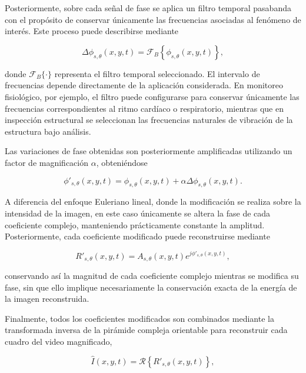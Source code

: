 Posteriormente, sobre cada señal de fase se aplica un filtro temporal pasabanda con el propósito de conservar únicamente las frecuencias asociadas al fenómeno de interés. Este proceso puede describirse mediante

\begin{equation}
\Delta\phi_{s,\theta}(x,y,t)
=
\mathcal{F}_B
\left\{
\phi_{s,\theta}(x,y,t)
\right\},
\end{equation}

donde $\mathcal{F}_B\{\cdot\}$ representa el filtro temporal seleccionado. El intervalo de frecuencias depende directamente de la aplicación considerada. En monitoreo fisiológico, por ejemplo, el filtro puede configurarse para conservar únicamente las frecuencias correspondientes al ritmo cardíaco o respiratorio, mientras que en inspección estructural se seleccionan las frecuencias naturales de vibración de la estructura bajo análisis.

Las variaciones de fase obtenidas son posteriormente amplificadas utilizando un factor de magnificación $\alpha$, obteniéndose

\begin{equation}
\phi'_{s,\theta}(x,y,t)
=
\phi_{s,\theta}(x,y,t)
+
\alpha
\Delta\phi_{s,\theta}(x,y,t).
\end{equation}

A diferencia del enfoque Euleriano lineal, donde la modificación se realiza sobre la intensidad de la imagen, en este caso únicamente se altera la fase de cada coeficiente complejo, manteniendo prácticamente constante la amplitud. Posteriormente, cada coeficiente modificado puede reconstruirse mediante

\begin{equation}
R'_{s,\theta}(x,y,t)
=
A_{s,\theta}(x,y,t)
e^{j\phi'_{s,\theta}(x,y,t)},
\label{eq:reconstruction}
\end{equation}

conservando así la magnitud de cada coeficiente complejo mientras se modifica su fase, sin que ello implique necesariamente la conservación exacta de la energía de la imagen reconstruida.

Finalmente, todos los coeficientes modificados son combinados mediante la transformada inversa de la pirámide compleja orientable para reconstruir cada cuadro del video magnificado,

\begin{equation}
\hat{I}(x,y,t)
=
\mathcal{R}
\left\{
R'_{s,\theta}(x,y,t)
\right\},
\end{equation}

